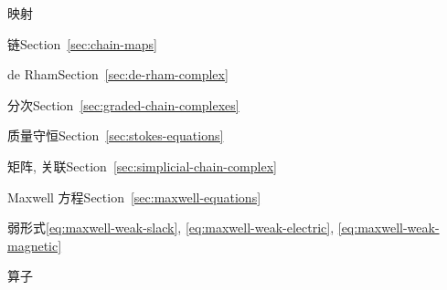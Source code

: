 \par\noindent\hspace*{0em}\label{index:map}{映射}

\par\noindent\hspace*{1em}\label{index:map-chain}{链}\quad Section~\ref{sec:chain-maps}

\par\noindent\hspace*{1em}\label{index:map-de-rham}{de Rham}\quad Section~\ref{sec:de-rham-complex}

\par\noindent\hspace*{1em}\label{index:map-graded}{分次}\quad Section~\ref{sec:graded-chain-complexes}

\par\noindent\hspace*{0em}\label{index:mass-conservation}{质量守恒}\quad Section~\ref{sec:stokes-equations}

\par\noindent\hspace*{0em}\label{index:matrix-incidence}{矩阵, 关联}\quad Section~\ref{sec:simplicial-chain-complex}

\par\noindent\hspace*{0em}\label{index:maxwell-s-equations}{Maxwell 方程}\quad Section~\ref{sec:maxwell-equations}

\par\noindent\hspace*{1em}\label{index:maxwell-s-equations-weak-formulation}{弱形式}\quad \eqref{eq:maxwell-weak-slack}, \eqref{eq:maxwell-weak-electric}, \eqref{eq:maxwell-weak-magnetic}

\par\noindent\hspace*{0em}\label{index:operator}{算子}

